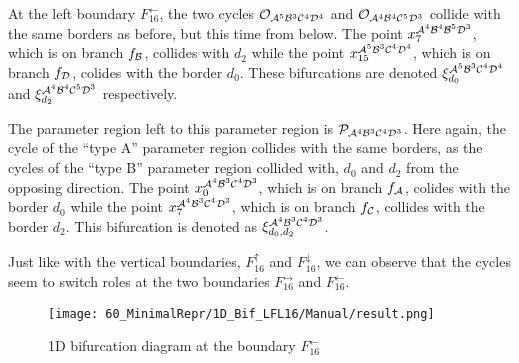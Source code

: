 At the left boundary $F_{16}^\leftarrow$, the two cycles $\mathcal{O}_{\mathcal{A}^5\mathcal{B}^3\mathcal{C}^4\mathcal{D}^4}$ and $\mathcal{O}_{\mathcal{A}^4\mathcal{B}^4\mathcal{C}^5\mathcal{D}^3}$ collide with the same borders as before, but this time from below.
The point $x_{7}^{\mathcal{A}^4\mathcal{B}^4\mathcal{B}^5\mathcal{D}^3}$, which is on branch $f_{\mathcal{B}}$, collides with $d_2$ while the point $x_{15}^{\mathcal{A}^5\mathcal{B}^3\mathcal{C}^4\mathcal{D}^4}$, which is on branch $f_{\mathcal{D}}$, colides with the border $d_0$.
These bifurcations are denoted $\xi_{d_0}^{\mathcal{A}^5\mathcal{B}^3\mathcal{C}^4\mathcal{D}^4}$ and $\xi_{d_2}^{\mathcal{A}^4\mathcal{B}^4\mathcal{C}^5\mathcal{D}^3}$ respectively.

The parameter region left to this parameter region is $\mathcal{P}_{\mathcal{A}^4\mathcal{B}^3\mathcal{C}^4\mathcal{D}^3}$.
Here again, the cycle of the ``type A'' parameter region collides with the same borders, as the cycles of the ``type B'' parameter region collided with, $d_0$ and $d_2$ from the opposing direction.
The point $x_{0}^{\mathcal{A}^4\mathcal{B}^3\mathcal{C}^4\mathcal{D}^3}$, which is on branch $f_{\mathcal{A}}$, colides with the border $d_0$ while the point $x_{7}^{\mathcal{A}^4\mathcal{B}^3\mathcal{C}^4\mathcal{D}^3}$, which is on branch $f_{\mathcal{C}}$, collides with the border $d_2$.
This bifurcation is denoted as $\xi_{d_0, d_2}^{\mathcal{A}^4\mathcal{B}^3\mathcal{C}^4\mathcal{D}^3}$.

Just like with the vertical boundaries, $F_{16}^\uparrow$ and $F_{16}^\downarrow$, we can observe that the cycles seem to switch roles at the two boundaries $F_{16}^\rightarrow$ and $F_{16}^\leftarrow$.

\begin{figure}
    \centering
    \texttt{[image: 60\_MinimalRepr/1D\_Bif\_LFL16/Manual/result.png]}
    \label{fig:final.bifurcation.F.left}
    \caption{1D bifurcation diagram at the boundary $F_{16}^\leftarrow$}
\end{figure}


